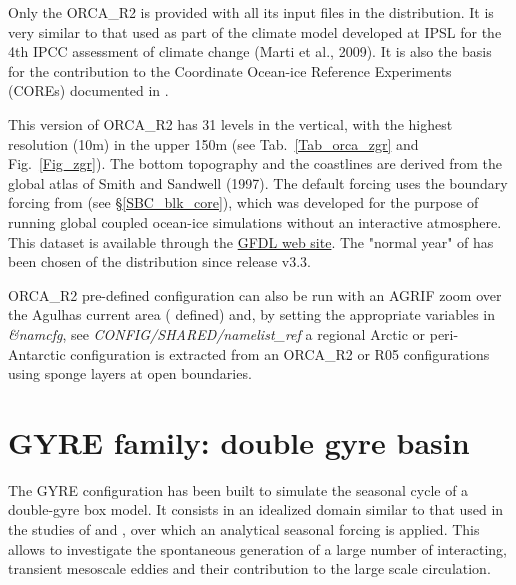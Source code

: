 Only the ORCA\_R2 is provided with all its input files in the \NEMO distribution. 
It is very similar to that used as part of the climate model developed at IPSL for the 4th IPCC 
assessment of climate change (Marti et al., 2009). It is also the basis for the \NEMO contribution 
to the Coordinate Ocean-ice Reference Experiments (COREs) documented in \citet{Griffies_al_OM09}. 

This version of ORCA\_R2 has 31 levels in the vertical, with the highest resolution (10m) 
in the upper 150m (see Tab.~\ref{Tab_orca_zgr} and Fig.~\ref{Fig_zgr}). 
The bottom topography and the coastlines are derived from the global atlas of Smith and Sandwell (1997). 
The default forcing uses the boundary forcing from \citet{Large_Yeager_Rep04} (see \S\ref{SBC_blk_core}), 
which was developed for the purpose of running global coupled ocean-ice simulations 
without an interactive atmosphere. This \citet{Large_Yeager_Rep04} dataset is available 
through the \href{http://nomads.gfdl.noaa.gov/nomads/forms/mom4/CORE.html}{GFDL web site}. 
The "normal year" of \citet{Large_Yeager_Rep04} has been chosen of the \NEMO distribution 
since release v3.3. 

ORCA\_R2 pre-defined configuration can also be run with an AGRIF zoom over the Agulhas 
current area (   defined) and,  by setting the appropriate variables in 
\textit{\&namcfg}, see \textit{CONFIG/SHARED/namelist\_ref}
a regional Arctic or peri-Antarctic configuration is extracted from an ORCA\_R2 or R05 configurations
using sponge layers at open boundaries. 

\section{GYRE family: double gyre basin }
\label{CFG_gyre}

The GYRE configuration \citep{Levy_al_OM10} has been built to simulate
the seasonal cycle of a double-gyre box model. It consists in an idealized domain 
similar to that used in the studies of \citet{Drijfhout_JPO94} and \citet{Hazeleger_Drijfhout_JPO98, 
Hazeleger_Drijfhout_JPO99, Hazeleger_Drijfhout_JGR00, Hazeleger_Drijfhout_JPO00}, 
over which an analytical seasonal forcing is applied. This allows to investigate the 
spontaneous generation of a large number of interacting, transient mesoscale eddies 
and their contribution to the large scale circulation. 

